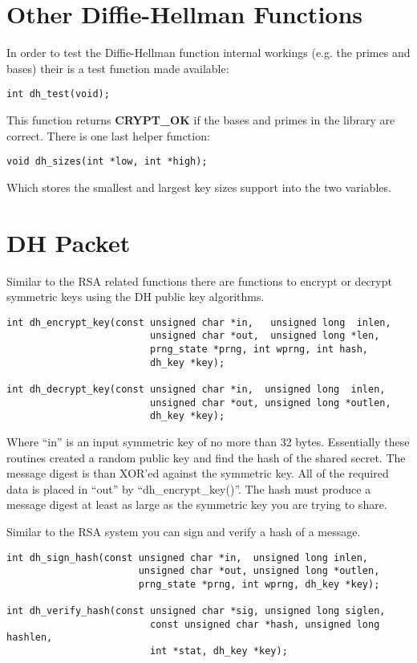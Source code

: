\documentclass[synpaper]{book}
\begin{document}
\section{Other Diffie-Hellman Functions}
In order to test the Diffie-Hellman function internal workings (e.g. the primes and bases) their is a test function made
available:
\begin{verbatim}
int dh_test(void);
\end{verbatim}

This function returns {\bf CRYPT\_OK} if the bases and primes in the library are correct.  There is one last helper
function:
\begin{verbatim}
void dh_sizes(int *low, int *high);
\end{verbatim}
Which stores the smallest and largest key sizes support into the two variables.

\section{DH Packet}
Similar to the RSA related functions there are functions to encrypt or decrypt symmetric keys using the DH public key
algorithms.
 
\begin{verbatim}
int dh_encrypt_key(const unsigned char *in,   unsigned long  inlen,
                         unsigned char *out,  unsigned long *len,
                         prng_state *prng, int wprng, int hash,
                         dh_key *key);

int dh_decrypt_key(const unsigned char *in,  unsigned long  inlen,
                         unsigned char *out, unsigned long *outlen,
                         dh_key *key);
\end{verbatim}
Where ``in'' is an input symmetric key of no more than 32 bytes.  Essentially these routines created a random public key
and find the hash of the shared secret.  The message digest is than XOR'ed against the symmetric key.  All of the
required data is placed in ``out'' by ``dh\_encrypt\_key()''.   The hash must produce a message digest at least as large
as the symmetric key you are trying to share.

Similar to the RSA system you can sign and verify a hash of a message.
 
\begin{verbatim}
int dh_sign_hash(const unsigned char *in,  unsigned long inlen,
                       unsigned char *out, unsigned long *outlen,
                       prng_state *prng, int wprng, dh_key *key);

int dh_verify_hash(const unsigned char *sig, unsigned long siglen,
                         const unsigned char *hash, unsigned long hashlen,
                         int *stat, dh_key *key);
\end{verbatim}
\end{document}
